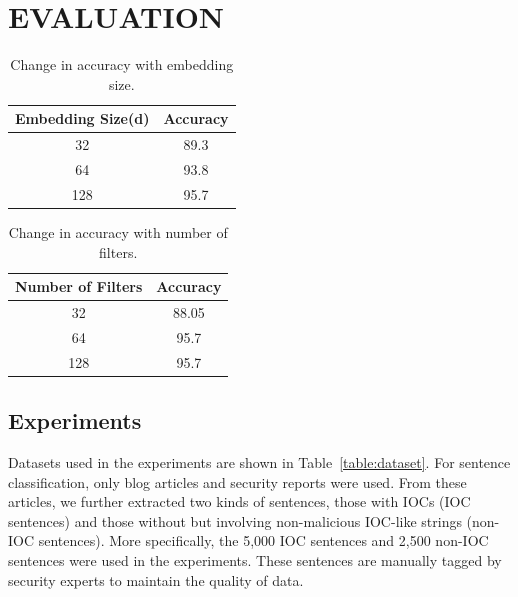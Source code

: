 \chapter{EVALUATION} \label{evaluation}


\begin{table}[tb]
	\centering
	\begin{tabular}{|c|c|}
		\hline
		\multicolumn{1}{|c|}{\textbf{Embedding Size(d)}} & \multicolumn{1}{c|}{\textbf{Accuracy}} \\
		\hline
		32 & 89.3 \\
		\hline
		64 & 93.8\\
		\hline
		128 &  95.7\\
		\hline
		
	\end{tabular}
	\caption[]{Change in accuracy with embedding size.}
	\label{table:accuracyembedding}
\end{table}

\begin{table}[tb]
	\centering
	\begin{tabular}{|c|c|}
		\hline
		\multicolumn{1}{|c|}{\textbf{Number of Filters}} & \multicolumn{1}{c|}{\textbf{Accuracy}} \\
		\hline
		32 & 88.05 \\
		\hline
		64 & 95.7\\
		\hline
		128 &  95.7\\
		\hline
		
	\end{tabular}
	\caption[]{Change in accuracy with number of filters.}
	\label{table:accuracyfilters}
\end{table}


\section{Experiments}
Datasets used in the experiments are shown in Table~\ref{table:dataset}. For sentence classification, only blog articles and security reports were used.
From these articles, we further extracted two kinds of sentences, those with IOCs (IOC sentences) and those without but involving non-malicious IOC-like strings (non-IOC sentences). More specifically, the 5,000 IOC sentences and 2,500 non-IOC sentences were used in the experiments. These sentences are manually tagged by security experts to maintain the quality of data.

